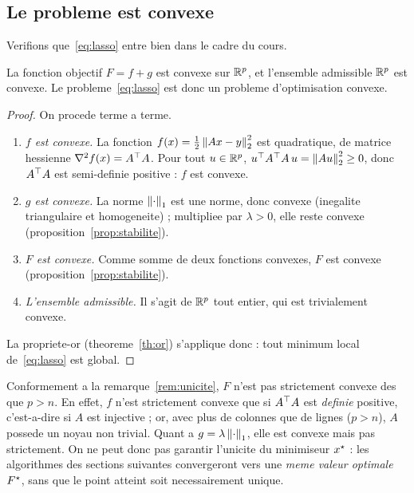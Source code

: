 \subsection{Le probleme est convexe}

Verifions que~\eqref{eq:lasso} entre bien dans le cadre du cours.

\begin{proposition}
\label{prop:convexe}
La fonction objectif $F = f + g$ est convexe sur $\mathbb{R}^{p}$, et l'ensemble
admissible $\mathbb{R}^{p}$ est convexe. Le probleme~\eqref{eq:lasso} est donc un
probleme d'optimisation convexe.
\end{proposition}

\begin{proof}
On procede terme a terme.
\begin{enumerate}
  \item \emph{$f$ est convexe.} La fonction $f(x) = \tfrac12\left\lVert Ax-y \right\rVert_2^2$ est
        quadratique, de matrice hessienne $\nabla^2 f(x) = A^{\top} A$. Pour tout
        $u \in \mathbb{R}^{p}$, $u^{\top} A^{\top} A\, u = \left\lVert A u \right\rVert_2^2 \ge 0$, donc $A^{\top} A$ est
        semi-definie positive : $f$ est convexe.
  \item \emph{$g$ est convexe.} La norme $\left\lVert \cdot \right\rVert_1$ est une norme, donc
        convexe (inegalite triangulaire et homogeneite) ; multipliee par
        $\lambda > 0$, elle reste convexe
        (proposition~\ref{prop:stabilite}).
  \item \emph{$F$ est convexe.} Comme somme de deux fonctions convexes, $F$ est
        convexe (proposition~\ref{prop:stabilite}).
  \item \emph{L'ensemble admissible.} Il s'agit de $\mathbb{R}^{p}$ tout entier, qui est
        trivialement convexe.
\end{enumerate}
La propriete-or (theoreme~\ref{th:or}) s'applique donc : tout minimum local
de~\eqref{eq:lasso} est global.
\end{proof}

\begin{remarque}
\label{rem:pas-stricte}
Conformement a la remarque~\ref{rem:unicite}, $F$ n'est pas strictement convexe
des que $p > n$. En effet, $f$ n'est strictement convexe que si $A^{\top} A$ est
\emph{definie} positive, c'est-a-dire si $A$ est injective ; or, avec plus de
colonnes que de lignes ($p > n$), $A$ possede un noyau non trivial. Quant a
$g = \lambda\left\lVert \cdot \right\rVert_1$, elle est convexe mais pas strictement. On ne peut
donc pas garantir l'unicite du minimiseur $x^{\star}$ : les algorithmes des sections
suivantes convergeront vers une \emph{meme valeur optimale} $F^{\star}$, sans que le
point atteint soit necessairement unique.
\end{remarque}

